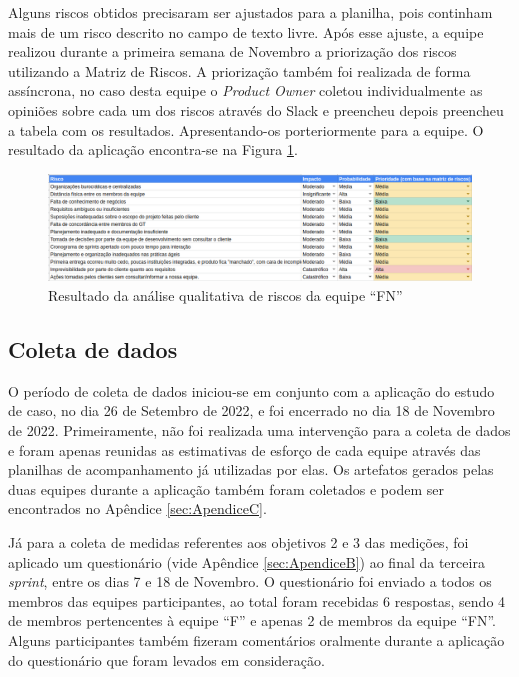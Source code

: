 \documentclass[
    12pt,       %
    openright,      %
    twoside,      %
    a4paper,      %
    english,      %
    french,       %
    spanish,      %
    brazil,       %
    ]{abntex2}
\begin{document}
Alguns riscos obtidos precisaram ser ajustados para a planilha, pois continham mais de um risco descrito no campo de texto livre. Após esse ajuste, a equipe realizou durante a primeira semana de Novembro a priorização dos riscos utilizando a Matriz de Riscos. A priorização também foi realizada de forma assíncrona, no caso desta equipe o \textit{Product Owner} coletou individualmente as opiniões sobre cada um dos riscos através do Slack e preencheu depois preencheu a tabela com os resultados. Apresentando-os porteriormente para a equipe. O resultado da aplicação encontra-se na Figura \ref{fig:result_fruit}.

\begin{figure}[H]
    \centering
    \includegraphics[width=1\textwidth]{src/tex/img/resultado-fruit.png}
    \caption{Resultado da análise qualitativa de riscos da equipe ``FN''}
    \label{fig:result_fruit}
\end{figure}

\subsection{Coleta de dados}

O período de coleta de dados iniciou-se em conjunto com a aplicação do estudo de caso, no dia 26 de Setembro de 2022, e foi encerrado no dia 18 de Novembro de 2022. Primeiramente, não foi realizada uma intervenção para a coleta de dados e foram apenas reunidas as estimativas de esforço de cada equipe através das planilhas de acompanhamento já utilizadas por elas. Os artefatos gerados pelas duas equipes durante a aplicação também foram coletados e podem ser encontrados no Apêndice \ref{sec:ApendiceC}. 

Já para a coleta de medidas referentes aos objetivos 2 e 3 das medições, foi aplicado um questionário (vide Apêndice \ref{sec:ApendiceB}) ao final da terceira \textit{sprint}, entre os dias 7 e 18 de Novembro. O questionário foi enviado a todos os membros das equipes participantes, ao total foram recebidas 6 respostas, sendo 4 de membros pertencentes à equipe ``F'' e apenas 2 de membros da equipe ``FN''. Alguns participantes também fizeram comentários oralmente durante a aplicação do questionário que foram levados em consideração.
\end{document}

